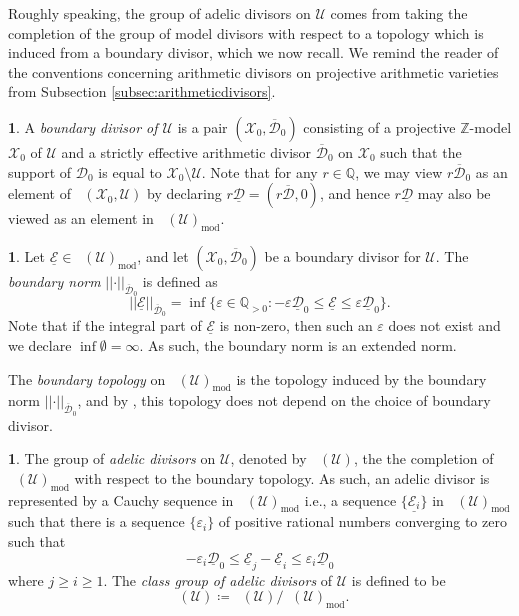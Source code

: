 \documentclass[11pt,reqno]{amsart}
\newcommand{\mZ}{\mathbb{Z}}
\newcommand{\mQ}{\mathbb{Q}}
\newcommand{\cX}{\mathcal{X}}
\newcommand{\cE}{\mathcal{E}}
\newcommand{\cD}{\mathcal{D}}
\newcommand{\cU}{\mathcal{U}}
\newcommand{\nrm}[1]{\left|\left |#1\right |\right |}
\theoremstyle{theorem}
\numberwithin{equation}{subsection}
\numberwithin{equation}{subsection}
\theoremstyle{definition}
\newtheorem{definition}[subsubsection]{\text{Definition}}
\theoremstyle{remark}
\numberwithin{equation}{subsubsection} \numberwithin{figure}{section}
\DeclareMathOperator{\aDiv}{\widehat{Div}}
\DeclareMathOperator{\aCaCl}{\widehat{CaCl}}
\DeclareMathOperator{\aPr}{\widehat{Pr}}
\newcommand{\cdef}[1]{\textsf{\textit{#1}}}
\renewcommand{\leq}{\leqslant}
\renewcommand{\geq}{\geqslant}
\DeclareMathOperator{\model}{mod}
\begin{document}
Roughly speaking, the group of adelic divisors on $\cU$ comes from taking the completion of the group of model divisors with respect to a topology which is induced from a boundary divisor, which we now recall. 
We remind the reader of the conventions concerning arithmetic divisors on projective arithmetic varieties from Subsection \ref{subsec:arithmeticdivisors}. 

\begin{definition}\label{defn:boundarydivisor}
A \cdef{boundary divisor of $\cU$} is a pair $(\cX_0,\overline{\cD}_0)$ consisting of a projective $\mZ$-model $\cX_0$ of $\cU$ and a strictly effective arithmetic divisor $\overline{\cD}_0$ on $\cX_0$ such that the support of $\cD_0$ is equal to $\cX_0\setminus \cU$. 
Note that for any $r\in \mQ$, we may view $r\overline{\cD}_0$ as an element of $\aDiv(\cX_0,\cU)$ by declaring $r\underline{\cD} = (r\overline{\cD},0)$, and hence $r\underline{\cD}$ may also be viewed as an element in $\aDiv(\cU)_{\model}$. 
\end{definition}

\begin{definition}
Let $\underline{\cE} \in \aDiv(\cU)_{\model}$, and let $(\cX_0,\overline{\cD}_0)$ be a boundary divisor for $\cU$. 
The \cdef{boundary norm} $\nrm{\cdot}_{\overline{\cD}_0}$ is defined as
\[
\nrm{\underline{\cE}}_{\overline{\cD}_0} = \inf \{ \varepsilon\in \mQ_{>0} : -\varepsilon\underline{\cD}_0 \leq \underline{\cE} \leq \varepsilon\underline{\cD}_0\}.
\]
Note that if the integral part of $\underline{\cE}$ is non-zero, then such an $\varepsilon$ does not exist and we declare $\inf \emptyset = \infty$. 
As such, the boundary norm is an extended norm. 
\end{definition}

The \cdef{boundary topology} on $\aDiv(\cU)_{\model}$ is the topology induced by the boundary norm $\nrm{\cdot}_{\overline{\cD}_0}$, and by \cite[Lemma 2.5.1]{YuanZhang:AdelicLineBundles}, this topology does not depend on the choice of boundary divisor. 

\begin{definition}
The group of \cdef{adelic divisors} on $\cU$, denoted by $\aDiv(\cU)$, the the completion of $\aDiv(\cU)_{\model}$  with respect to the boundary topology. 
As such, an adelic divisor is represented by a Cauchy sequence in $\aDiv(\cU)_{\model}$ i.e., a sequence $\{ \underline{\cE_i}\}$ in $\aDiv(\cU)_{\model}$ such that there is a sequence $\{ \varepsilon_i\}$ of positive rational numbers converging to zero such that
\[
-\varepsilon_i \underline{\cD}_0 \leq \underline{\cE}_j - \underline{\cE}_i \leq \varepsilon_i\underline{\cD}_0
\]
where $j\geq i\geq 1$. 
The \cdef{class group of adelic divisors} of $\cU$ is defined to be
\[
\aCaCl(\cU) \coloneqq \aDiv(\cU)/\aPr(\cU)_{\model}.
\]
\end{definition}
\end{document}

